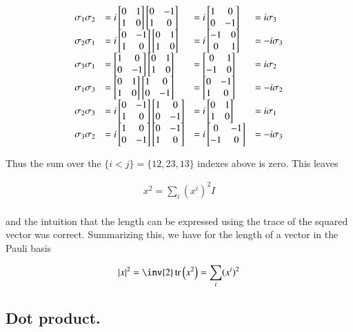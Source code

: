 \documentclass{article}
\DeclareMathOperator{\tr}{tr}
\newcommand{\trace}[1]{\tr\left({#1}\right)}
\newcommand{\PauliX}[0]{
\begin{bmatrix}
0 & 1 \\
1 & 0 \\
\end{bmatrix}
}
\newcommand{\PauliYNoI}[0]{
\begin{bmatrix}
0 & -1 \\
1 & 0 \\
\end{bmatrix}
}
\newcommand{\PauliZ}[0]{
\begin{bmatrix}
1 & 0 \\
0 & -1 \\
\end{bmatrix}
}
\begin{document}
\begin{align*}
\begin{array}{l l l l}
\sigma_1 \sigma_2 &= i \PauliX \PauliYNoI    &= i \PauliZ                                  &=  i \sigma_3 \\
\sigma_2 \sigma_1 &= i \PauliYNoI \PauliX    &= i \begin{bmatrix}-1 & 0 \\0 & 1\end{bmatrix} &= -i \sigma_3 \\
\sigma_3 \sigma_1 &= \PauliZ \PauliX         &=   \begin{bmatrix}0 & 1 \\-1 & 0\end{bmatrix} &=  i \sigma_2 \\
\sigma_1 \sigma_3 &= \PauliX \PauliZ         &=   \begin{bmatrix}0 & -1 \\1 & 0\end{bmatrix} &= -i \sigma_2 \\
\sigma_2 \sigma_3 &= i \PauliYNoI \PauliZ    &= i \PauliX                                  &=  i \sigma_1 \\
\sigma_3 \sigma_2 &= i \PauliZ \PauliYNoI    &= i \begin{bmatrix}0 & -1 \\-1 & 0\end{bmatrix} &= -i \sigma_3 \\
\end{array}
\end{align*}

Thus the sum over the $\{i < j\} = \{12, 23, 13\}$ indexes above is zero.  This leaves 

\begin{align*}
x^2 = \sum_i (x^i)^2 I \\
\end{align*}

and the intuition that the length can be expressed using the trace of the squared vector was correct.  Summarizing this, we have for the length of a vector in the Pauli basis

\begin{align}
\Abs{x}^2 = \inv{2} \trace{x^2} = \sum_i (x^i)^2
\end{align}

\subsection{ Dot product. }
\end{document}
